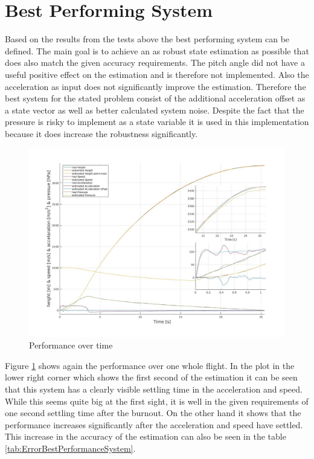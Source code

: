\section{Best Performing System}
Based on the results from the tests above the best performing system can be defined.
The main goal is to achieve an as robust state estimation as possible that does also match the given accuracy requirements.
The pitch angle did not have a useful positive effect on the estimation and is therefore not implemented.
Also the acceleration as input does not significantly improve the estimation.
Therefore the best system for the stated problem consist of the additional acceleration offset as a state vector as well as better calculated system noise.
Despite the fact that the pressure is risky to implement as a state variable it is used in this implementation because it does increase the robustness significantly.

\begin{figure}[h!]
 \centering
 \includegraphics[width=.8\textwidth]{./Pictures/BestSystemPerformance.jpg}
 \caption{Performance over time}
 \label{fig:BestSystemPerformance}
\end{figure}

Figure \ref{fig:BestSystemPerformance} shows again the performance over one whole flight.
In the plot in the lower right corner which shows the first second of the estimation it can be seen that this system has a clearly visible settling time in the acceleration and speed.
While this seems quite big at the first sight, it is well in the given requirements of one second settling time after the burnout.
On the other hand it shows that the performance increases significantly after the acceleration and speed have settled.
This increase in the accuracy of the estimation can also be seen in the table \ref{tab:ErrorBestPerformanceSystem}.


